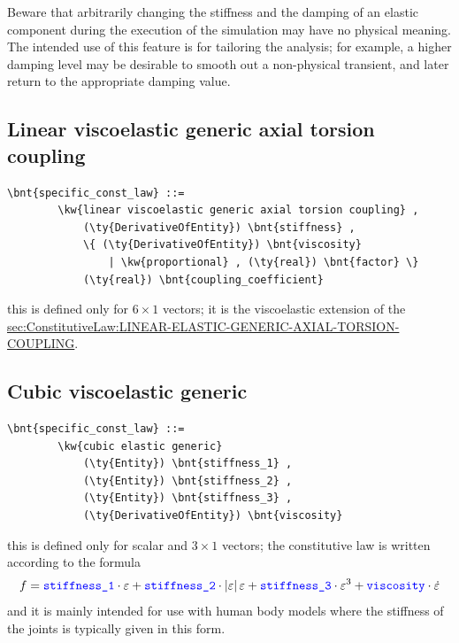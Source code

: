 Beware that arbitrarily changing the stiffness
and the damping of an elastic component during the execution
of the simulation may have no physical meaning.
The intended use of this feature is for tailoring the analysis;
for example, a higher damping level may be desirable to smooth out
a non-physical transient, and later return to the appropriate damping value.
  
\subsection{Linear viscoelastic generic axial torsion coupling}
\begin{Verbatim}[commandchars=\\\{\}]
    \bnt{specific_const_law} ::= 
        \kw{linear viscoelastic generic axial torsion coupling} ,
            (\ty{DerivativeOfEntity}) \bnt{stiffness} ,
            \{ (\ty{DerivativeOfEntity}) \bnt{viscosity} 
                | \kw{proportional} , (\ty{real}) \bnt{factor} \}
            (\ty{real}) \bnt{coupling_coefficient}
\end{Verbatim}
this is defined only for $6 \times 1$ vectors; it is the viscoelastic 
extension of the 
\hyperref{\kw{linear elastic generic axial torsion coupling} constitutive law}{\kw{linear elastic generic axial torsion coupling} constitutive law (see Section~}{)}{sec:ConstitutiveLaw:LINEAR-ELASTIC-GENERIC-AXIAL-TORSION-COUPLING}.


\subsection{Cubic viscoelastic generic}
\begin{Verbatim}[commandchars=\\\{\}]
    \bnt{specific_const_law} ::= 
        \kw{cubic elastic generic}
            (\ty{Entity}) \bnt{stiffness_1} ,
            (\ty{Entity}) \bnt{stiffness_2} ,
            (\ty{Entity}) \bnt{stiffness_3} ,
            (\ty{DerivativeOfEntity}) \bnt{viscosity}
\end{Verbatim}
this is defined only for scalar and $3 \times 1$ vectors; the constitutive
law is written according to the formula
\begin{displaymath}
	f = \textcolor{blue}{\texttt{stiffness\_1}} \cdot \varepsilon
	+ \textcolor{blue}{\texttt{stiffness\_2}} \cdot \left| \varepsilon \right|\varepsilon
	+ \textcolor{blue}{\texttt{stiffness\_3}} \cdot \varepsilon^3
	+ \textcolor{blue}{\texttt{viscosity}} \cdot \dot{\varepsilon}
\end{displaymath}
and it is mainly intended for use with human body models 
where the stiffness of the joints is typically given in this form.

